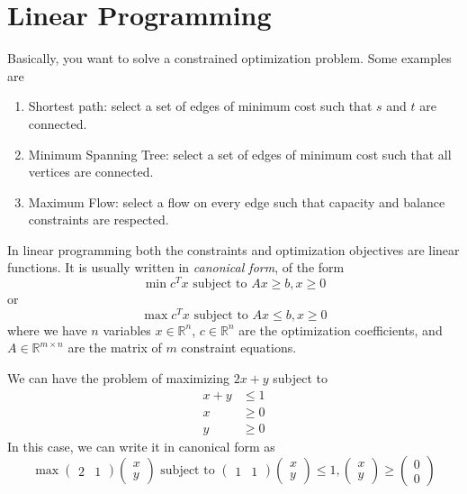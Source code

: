 \section{Linear Programming}

  Basically, you want to solve a constrained optimization problem. Some examples are 
  \begin{enumerate}
    \item Shortest path: select a set of edges of minimum cost such that $s$ and $t$ are connected. 
    \item Minimum Spanning Tree: select a set of edges of minimum cost such that all vertices are connected. 
    \item Maximum Flow: select a flow on every edge such that capacity and balance constraints are respected. 
  \end{enumerate} 


  \begin{definition}
    In linear programming both the constraints and optimization objectives are linear functions. It is usually written in \textit{canonical form}, of the form 
    \begin{equation}
      \min c^T x \text{ subject to } Ax \geq b, x \geq 0
    \end{equation}
    or 
    \begin{equation}
      \max c^T x \text{ subject to } Ax \leq b, x \geq 0
    \end{equation}
    where we have $n$ variables $x \in \mathbb{R}^n$, $c \in \mathbb{R}^n$ are the optimization coefficients, and $A \in \mathbb{R}^{m \times n}$ are the matrix of $m$ constraint equations. 
  \end{definition} 

  \begin{example}[Simple LP]
    We can have the problem of maximizing $2x + y$ subject to 
    \begin{align}
      x + y & \leq 1 \\ 
      x & \geq 0  \\
      y & \geq 0
    \end{align}
    In this case, we can write it in canonical form as 
    \begin{equation}
      \max \begin{pmatrix} 2 & 1 \end{pmatrix} \begin{pmatrix} x \\ y \end{pmatrix} \text{ subject to } \begin{pmatrix} 1 & 1 \end{pmatrix} \begin{pmatrix} x \\ y \end{pmatrix} \leq 1, \begin{pmatrix} x \\ y \end{pmatrix} \geq \begin{pmatrix} 0 \\ 0 \end{pmatrix}
    \end{equation}
  \end{example}

